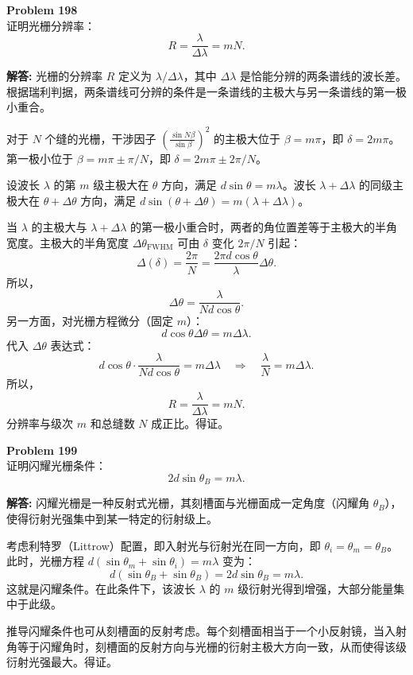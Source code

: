 \documentclass[12pt, a4paper, oneside]{ctexart}
\newenvironment{solution}{\par\noindent\textbf{解答:}\quad}{\par}
\begin{document}
\begin{mdframed}[backgroundcolor=gray!10, linewidth=0pt]
    \textbf{Problem 198} \\
    证明光栅分辨率：
    \[
    R = \frac{\lambda}{\Delta\lambda} = m N.
    \]
\end{mdframed}
\begin{solution}
    光栅的分辨率 $R$ 定义为 $\lambda/\Delta\lambda$，其中 $\Delta\lambda$ 是恰能分辨的两条谱线的波长差。根据瑞利判据，两条谱线可分辨的条件是一条谱线的主极大与另一条谱线的第一极小重合。

    对于 $N$ 个缝的光栅，干涉因子 $\left( \frac{\sin N\beta}{\sin\beta} \right)^2$ 的主极大位于 $\beta = m\pi$，即 $\delta = 2m\pi$。第一极小位于 $\beta = m\pi \pm \pi/N$，即 $\delta = 2m\pi \pm 2\pi/N$。

    设波长 $\lambda$ 的第 $m$ 级主极大在 $\theta$ 方向，满足 $d \sin\theta = m\lambda$。波长 $\lambda + \Delta\lambda$ 的同级主极大在 $\theta + \Delta\theta$ 方向，满足 $d \sin(\theta+\Delta\theta) = m(\lambda+\Delta\lambda)$。

    当 $\lambda$ 的主极大与 $\lambda+\Delta\lambda$ 的第一极小重合时，两者的角位置差等于主极大的半角宽度。主极大的半角宽度 $\Delta\theta_{\text{FWHM}}$ 可由 $\delta$ 变化 $2\pi/N$ 引起：
    \[
    \Delta(\delta) = \frac{2\pi}{N} = \frac{2\pi d \cos\theta}{\lambda} \Delta\theta.
    \]
    所以，
    \[
    \Delta\theta = \frac{\lambda}{N d \cos\theta}.
    \]
    另一方面，对光栅方程微分（固定 $m$）：
    \[
    d \cos\theta \Delta\theta = m \Delta\lambda.
    \]
    代入 $\Delta\theta$ 表达式：
    \[
    d \cos\theta \cdot \frac{\lambda}{N d \cos\theta} = m \Delta\lambda \quad \Rightarrow \quad \frac{\lambda}{N} = m \Delta\lambda.
    \]
    所以，
    \[
    R = \frac{\lambda}{\Delta\lambda} = m N.
    \]
    分辨率与级次 $m$ 和总缝数 $N$ 成正比。得证。
\end{solution}

\begin{mdframed}[backgroundcolor=gray!10, linewidth=0pt]
    \textbf{Problem 199} \\
    证明闪耀光栅条件：
    \[
    2 d \sin\theta_B = m\lambda.
    \]
\end{mdframed}
\begin{solution}
    闪耀光栅是一种反射式光栅，其刻槽面与光栅面成一定角度（闪耀角 $\theta_B$），使得衍射光强集中到某一特定的衍射级上。

    考虑利特罗（Littrow）配置，即入射光与衍射光在同一方向，即 $\theta_i = \theta_m = \theta_B$。此时，光栅方程 $d (\sin\theta_m + \sin\theta_i) = m\lambda$ 变为：
    \[
    d (\sin\theta_B + \sin\theta_B) = 2d \sin\theta_B = m\lambda.
    \]
    这就是闪耀条件。在此条件下，该波长 $\lambda$ 的 $m$ 级衍射光得到增强，大部分能量集中于此级。

    推导闪耀条件也可从刻槽面的反射考虑。每个刻槽面相当于一个小反射镜，当入射角等于闪耀角时，刻槽面的反射方向与光栅的衍射主极大方向一致，从而使得该级衍射光强最大。得证。
\end{solution}
\end{document}
